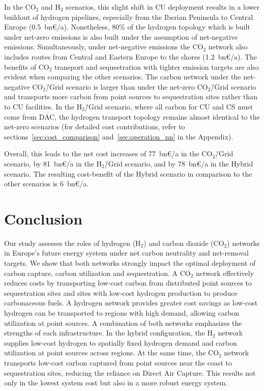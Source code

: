 \documentclass[twocolumn]{article}
\newcommand{\carbon}{CO$_2$}
\newcommand{\hydrogen}{H$_2$}
\newcommand{\carbonscenario}{CO$_2$\=/Grid scenario}
\newcommand{\hydrogenscenario}{H$_2$\=/Grid scenario}
\newcommand{\hybridscenario}{Hybrid scenario}
\begin{document}
In the \carbon{} and \hydrogen{} scenarios, this slight shift in CU deployment results in a lower buildout of hydrogen pipelines, especially from the Iberian Peninsula to Central Europe (0.5~bn€/a). Nonetheless, 80\% of the hydrogen topology which is built under net-zero emissions is also built under the assumption of net-negative emissions. Simultaneously, under net-negative emissions the \carbon{} network also includes routes from Central and Eastern Europe to the shores (1.2~bn€/a). The benefits of \carbon{} transport and sequestration with tighter emission targets are also evident when comparing the other scenarios. The carbon network under the net-negative \carbonscenario{} is larger than under the net-zero \carbonscenario{} and transports more carbon from point sources to sequestration sites rather than to CU facilities. In the \hydrogenscenario{}, where all carbon for CU and CS must come from DAC, the hydrogen transport topology remains almost identical to the net-zero scenarios (for detailed cost contributions, refer to sections~\ref{sec:cost_comparison} and~\ref{sec:operation_nn} in the Appendix).

Overall, this leads to the net cost increases of 77~bn€/a in the \carbonscenario{}, by 81~bn€/a in the \hydrogenscenario{}, and by 78~bn€/a in the \hybridscenario{}. The resulting cost-benefit of the \hybridscenario{} in comparison to the other scenarios is 6~bn€/a.


\section{Conclusion}
\label{sec:conclusion}
Our study assesses the roles of hydrogen (\hydrogen{}) and carbon dioxide (\carbon{}) networks in Europe's future energy system under net carbon neutrality and net-removal targets. We show that both networks strongly impact the optimal deployment of carbon capture, carbon utilization and sequestration. A \carbon{} network effectively reduces costs by transporting low-cost carbon from distributed point sources to sequestration sites and sites with low-cost hydrogen production to produce carbonaceous fuels. A hydrogen network provides greater cost savings as low-cost hydrogen can be transported to regions with high demand, allowing carbon utilization at point sources. A combination of both networks emphasizes the strengths of each infrastructure. In the hybrid configuration, the \hydrogen{} network supplies low-cost hydrogen to spatially fixed hydrogen demand and carbon utilization at point sources across regions. At the same time, the \carbon{} network transports low-cost carbon captured from point sources near the coast to sequestration sites, reducing the reliance on Direct Air Capture. This results not only in the lowest system cost but also in a more robust energy system.
\end{document}
